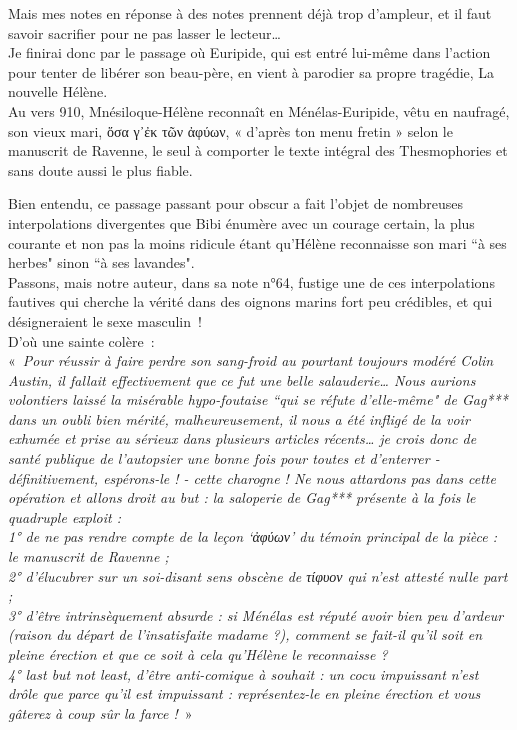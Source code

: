 \documentclass{book}%
\newcommand{\italique}[1]{\textit{#1}}%
\begin{document}
Mais mes notes en réponse à des notes prennent déjà trop d’ampleur, et il faut savoir sacrifier pour ne pas lasser le lecteur… \\
Je finirai donc par le passage où Euripide, qui est entré lui-même dans l’action pour tenter de libérer son beau-père, en vient à parodier sa propre tragédie, La nouvelle Hélène. \\
Au vers 910, Mnésiloque-Hélène reconnaît en Ménélas-Euripide, vêtu en naufragé, son vieux mari, ὅσα γ᾽ἐκ τῶν ἀφύων, « d’après ton menu fretin » selon le manuscrit de Ravenne, le seul à comporter le texte intégral des Thesmophories et sans doute aussi le plus fiable. 

Bien entendu, ce passage passant pour obscur a fait l’objet de nombreuses interpolations divergentes que Bibi énumère avec un courage certain, la plus courante et non pas la moins ridicule étant qu’Hélène reconnaisse son mari ``à ses herbes" sinon ``à ses lavandes". \\
Passons, mais notre auteur, dans sa note n°64, fustige une de ces interpolations fautives qui cherche la vérité dans des oignons marins fort peu crédibles, et qui désigneraient le sexe masculin ! \\
D’où une sainte colère : \\
« \italique{Pour réussir à faire perdre son sang-froid au pourtant toujours modéré Colin Austin, il fallait effectivement que ce fut une belle salauderie… Nous aurions volontiers laissé la misérable hypo-foutaise ``qui se réfute d’elle-même" de Gag*** dans un oubli bien mérité, malheureusement, il nous a été infligé de la voir exhumée et prise au sérieux dans plusieurs articles récents… je crois donc de santé publique de l’autopsier une bonne fois pour toutes et d’enterrer - définitivement, espérons-le ! - cette charogne ! 
Ne nous attardons pas dans cette opération et allons droit au but : la saloperie de Gag*** présente à la fois le quadruple exploit : \\
1° de ne pas rendre compte de la leçon ‘ἀφύων’ du témoin principal de la pièce : le manuscrit de Ravenne ; \\
2° d’élucubrer sur un soi-disant sens obscène de τίφυον qui n’est attesté nulle part ; \\
3° d’être intrinsèquement absurde : si Ménélas est réputé avoir bien peu d’ardeur (raison du départ de l’insatisfaite madame ?), comment se fait-il qu’il soit en pleine érection et que ce soit à cela qu’Hélène le reconnaisse ?\\
4° last but not least, d’être anti-comique à souhait : un cocu impuissant n’est drôle que parce qu’il est impuissant : représentez-le en pleine érection et vous gâterez à coup sûr la farce !} » \\
\end{document}

